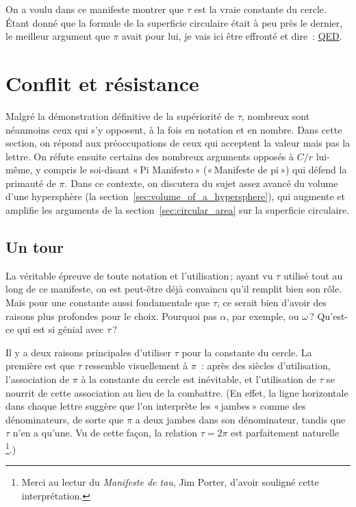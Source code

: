 On a voulu dans ce manifeste montrer que $\tau$ est la vraie constante du
cercle. Étant donné que la formule de la superficie circulaire était à peu près
le dernier, le meilleur argument que $\pi$ avait pour lui, je vais ici être
effronté et dire~:
\href{https://fr.wikipedia.org/wiki/CQFD_(math%C3%A9matiques)}{QED}.



\section{Conflit et résistance} %
\label{sec:conflict_and_resistance}

Malgré la démonstration définitive de la supériorité de $\tau$, nombreux sont
néanmoins ceux qui s'y opposent, à la fois en notation et en nombre. Dans cette
section, on répond aux préoccupations de ceux qui acceptent la valeur mais pas
la lettre. On réfute ensuite certains des nombreux arguments opposés à $C/r$
lui-même, y compris le soi-disant «\,Pi Manifesto\,» («\,Manifeste de pi\,») qui
défend la primauté de $\pi$. Dans ce contexte, on discutera du sujet assez
avancé du volume d'une hypersphère (la
section~\ref{sec:volume_of_a_hypersphere}), qui augmente et amplifie les
arguments de la section~\ref{sec:circular_area} sur la superficie circulaire.

  \subsection{Un tour} %
  \label{sec:one_turn}

La véritable épreuve de toute notation et l'utilisation\,; ayant vu $\tau$
utilisé tout au long de ce manifeste, on est peut-être déjà convaincu qu'il
remplit bien son rôle. Mais pour une constante aussi fondamentale que $\tau$, ce
serait bien d'avoir des raisons plus profondes pour le choix. Pourquoi pas
$\alpha$, par exemple, ou $\omega$\,? Qu'est-ce qui est si génial avec $\tau$\,?

Il y a deux raisons principales d'utiliser $\tau$ pour la constante du cercle.
La première est que $\tau$ ressemble visuellement à $\pi$~: après des siècles
d'utilisation, l'association de $\pi$ à la constante du cercle est inévitable,
et l'utilisation de $\tau$ se nourrit de cette association au lieu de la
combattre. (En effet, la ligne horizontale dans chaque lettre suggère que l'on
interprète les «\,jambes\,» comme des dénominateurs, de sorte que $\pi$ a deux
jambes dans son dénominateur, tandis que $\tau$ n'en a qu'une. Vu de cette
façon, la relation $\tau = 2\pi$ est parfaitement naturelle\,\footnote{Merci au
lectur du \emph{Manifeste de tau}, Jim Porter, d'avoir souligné cette
interprétation.}.)

